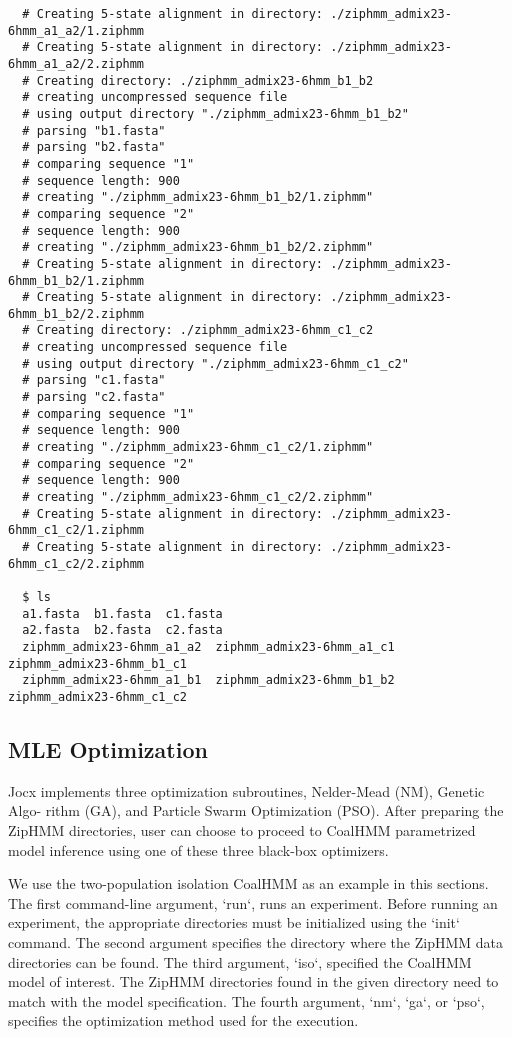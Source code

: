 {\begin{verbatim}
  # Creating 5-state alignment in directory: ./ziphmm_admix23-6hmm_a1_a2/1.ziphmm
  # Creating 5-state alignment in directory: ./ziphmm_admix23-6hmm_a1_a2/2.ziphmm
  # Creating directory: ./ziphmm_admix23-6hmm_b1_b2
  # creating uncompressed sequence file
  # using output directory "./ziphmm_admix23-6hmm_b1_b2"
  # parsing "b1.fasta"
  # parsing "b2.fasta"
  # comparing sequence "1"
  # sequence length: 900
  # creating "./ziphmm_admix23-6hmm_b1_b2/1.ziphmm"
  # comparing sequence "2"
  # sequence length: 900
  # creating "./ziphmm_admix23-6hmm_b1_b2/2.ziphmm"
  # Creating 5-state alignment in directory: ./ziphmm_admix23-6hmm_b1_b2/1.ziphmm
  # Creating 5-state alignment in directory: ./ziphmm_admix23-6hmm_b1_b2/2.ziphmm
  # Creating directory: ./ziphmm_admix23-6hmm_c1_c2
  # creating uncompressed sequence file
  # using output directory "./ziphmm_admix23-6hmm_c1_c2"
  # parsing "c1.fasta"
  # parsing "c2.fasta"
  # comparing sequence "1"
  # sequence length: 900
  # creating "./ziphmm_admix23-6hmm_c1_c2/1.ziphmm"
  # comparing sequence "2"
  # sequence length: 900
  # creating "./ziphmm_admix23-6hmm_c1_c2/2.ziphmm"
  # Creating 5-state alignment in directory: ./ziphmm_admix23-6hmm_c1_c2/1.ziphmm
  # Creating 5-state alignment in directory: ./ziphmm_admix23-6hmm_c1_c2/2.ziphmm

  $ ls
  a1.fasta  b1.fasta  c1.fasta
  a2.fasta  b2.fasta  c2.fasta
  ziphmm_admix23-6hmm_a1_a2  ziphmm_admix23-6hmm_a1_c1  ziphmm_admix23-6hmm_b1_c1
  ziphmm_admix23-6hmm_a1_b1  ziphmm_admix23-6hmm_b1_b2  ziphmm_admix23-6hmm_c1_c2
\end{verbatim}}

\subsection{MLE Optimization}

Jocx implements three optimization subroutines, Nelder-Mead (NM), Genetic Algo-
rithm (GA), and Particle Swarm Optimization (PSO). After preparing the ZipHMM
directories, user can choose to proceed to CoalHMM parametrized model inference
using one of these three black-box optimizers.

We use the two-population isolation CoalHMM as an example in this sections. The
first command-line argument, ‘run‘, runs an experiment. Before running an
experiment, the appropriate directories must be initialized using the ‘init‘
command. The second argument specifies the directory where the ZipHMM data
directories can be found. The third argument, ‘iso‘, specified the CoalHMM model
of interest. The ZipHMM directories found in the given directory need to match
with the model specification. The fourth argument, ‘nm‘, ‘ga‘, or ‘pso‘,
specifies the optimization method used for the execution.

